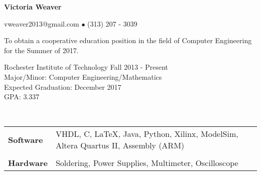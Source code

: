 \documentclass[9pt]{extbook} %
\begin{document}
	\centerline{\LARGE \bf Victoria Weaver}
	\centerline{vweaver2013@gmail.com $\bullet$ (313) 207 - 3039}
\noindent\makebox[\linewidth]{\rule{\textwidth}{1pt}}

\bigskip


\begin{addmargin}[2cm]{0cm}
	To obtain a cooperative education position in the field of Computer Engineering for the Summer of 2017.
\end{addmargin}

\bigskip


\begin{addmargin}[2cm]{0cm}
	Rochester Institute of Technology	\hfill Fall 2013 - Present
	\\ Major/Minor: Computer Engineering/Mathematics
	\\ Expected Graduation: December 2017
	\\ GPA: 3.337
\end{addmargin}

\bigskip


\\
\begin{addmargin}[2cm]{0cm}
\begin{tabular}{l l}
		\hline
		\textbf{Software}	&	VHDL, C, \LaTeX, Java, Python, Xilinx, ModelSim, Altera Quartus II, Assembly (ARM)\\
							&	\\
		\textbf{Hardware} 	&	Soldering, Power Supplies, Multimeter, Oscilloscope\\
		\hline
	\end{tabular}
\end{addmargin}

\bigskip

\end{document}

